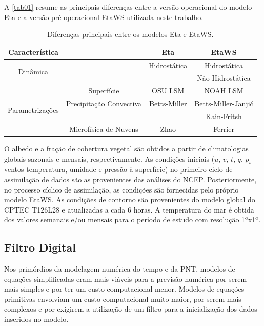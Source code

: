 A \autoref{tab01} resume as principais diferenças entre a versão operacional do modelo Eta e a versão pré-operacional EtaWS utilizada neste trabalho.

\begin{table}[ht]
\caption{Diferenças principais entre os modelos Eta e EtaWS.}
\label{tab01}
\centering
\begin{tabular}{c|c|c|c}
\hline
Característica                       &                         & Eta               & EtaWS              \\
\hline
\multirow{2}{2.8cm}{Dinâmica}        &                         & Hidrostática      & Hidrostática       \\
                                     &                         &                   & Não-Hidrostática   \\
\hline
                                     & Superfície              & OSU LSM           & NOAH LSM           \\ 
\multirow{2}{2.8cm}{Parametrizações} & Precipitação Convectiva & Betts-Miller      & Betts-Miller-Janjić\\
                                     &                         &                   & Kain-Fritsh        \\
                                     & Microfísica de Nuvens   & Zhao              & Ferrier            \\
\hline
\end{tabular}
\end{table}

O albedo e a fração de cobertura vegetal são obtidos a partir de climatologias globais sazonais e mensais, respectivamente. As condições iniciais ($u$, $v$, $t$, $q$, $p_{s}$ - ventos temperatura, umidade e pressão à superfície) no primeiro ciclo de assimilação de dados são as provenientes das análises do NCEP. Posteriormente, no processo cíclico de assimilação, as condições são fornecidas pelo próprio modelo EtaWS. As condições de contorno são provenientes do modelo global do CPTEC T126L28 e atualizadas a cada 6 horas. A temperatura do mar é obtida dos valores semanais e/ou mensais para o período de estudo com resolução 1ºx1º.

\subsection{Filtro Digital}

Nos primórdios da modelagem numérica do tempo e da PNT, modelos de equações simplificadas eram mais viáveis para a previsão numérica por serem mais simples e por ter um custo computacional menor. Modelos de equações primitivas envolviam um custo computacional muito maior, por serem mais complexos e por exigirem a utilização de um filtro para a inicialização dos dados inseridos no modelo. 

